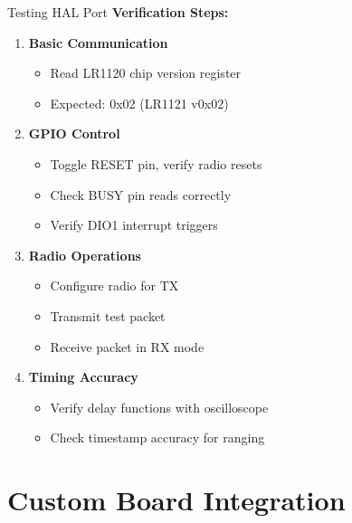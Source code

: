 \documentclass{beamer}
\begin{document}
\begin{frame}{Testing HAL Port}
\textbf{Verification Steps:}
\begin{enumerate}
    \item \textbf{Basic Communication}
    \begin{itemize}
        \item Read LR1120 chip version register
        \item Expected: 0x02 (LR1121 v0x02)
    \end{itemize}

    \item \textbf{GPIO Control}
    \begin{itemize}
        \item Toggle RESET pin, verify radio resets
        \item Check BUSY pin reads correctly
        \item Verify DIO1 interrupt triggers
    \end{itemize}

    \item \textbf{Radio Operations}
    \begin{itemize}
        \item Configure radio for TX
        \item Transmit test packet
        \item Receive packet in RX mode
    \end{itemize}

    \item \textbf{Timing Accuracy}
    \begin{itemize}
        \item Verify delay functions with oscilloscope
        \item Check timestamp accuracy for ranging
    \end{itemize}
\end{enumerate}
\end{frame}

\section{Custom Board Integration}
\end{document}
